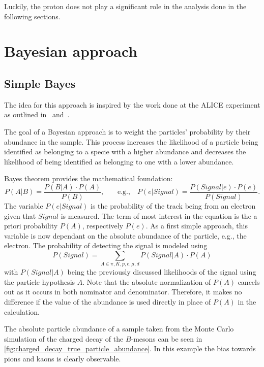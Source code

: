 Luckily, the proton does not play a significant role in the analysis done in the following sections.

\section{Bayesian approach}
\label{sec:bayesian_approach}

\subsection{Simple Bayes}
\label{subsec:bayesian_approach_simple_bayes}

The idea for this approach is inspired by the work done at the ALICE experiment as outlined in~\cite{Adam:2016acv} and~\cite{Belikov:2005zz}.

The goal of a Bayesian approach is to weight the particles' probability by their abundance in the sample. This process increases the likelihood of a particle being identified as belonging to a specie with a higher abundance and decreases the likelihood of being identified as belonging to one with a lower abundance.

Bayes theorem provides the mathematical foundation:
\begin{equation}
	\displaystyle P(A|B) = \frac{P(B|A) \cdot P(A)}{P(B)}
	\text{,}
	\qquad
	\text{e.g.,} \quad P(e|Signal) = \frac{P(Signal|e) \cdot P(e)}{P(Signal)}.
\end{equation}
The variable $P(e|Signal)$ is the probability of the track being from an electron given that $Signal$ is measured. The term of most interest in the equation is the a priori probability $P(A)$, respectively $P(e)$. As a first simple approach, this variable is now dependant on the absolute abundance of the particle, e.g., the electron. The probability of detecting the signal is modeled using
\begin{equation}
	P(Signal) = \sum \limits_{A \in {\pi, K, p, e, \mu, d}} P(Signal|A) \cdot P(A)
\end{equation}
with $P(Signal|A)$ being the previously discussed likelihoods of the signal using the particle hypothesis $A$. Note that the absolute normalization of $P(A)$ cancels out as it occurs in both nominator and denominator. Therefore, it makes no difference if the value of the abundance is used directly in place of $P(A)$ in the calculation.

The absolute particle abundance of a sample taken from the Monte Carlo simulation of the charged decay of the $B$-mesons can be seen in \autoref{fig:charged_decay_true_particle_abundance}. In this example the bias towards pions and kaons is clearly observable.

